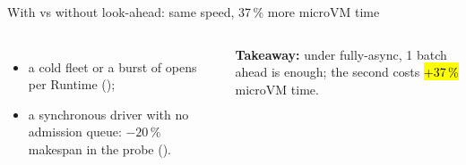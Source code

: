 \begin{frame}{With vs without look-ahead: same speed, 37\,\% more microVM time}
\begin{columns}[T]
\begin{itemize}
\item a cold fleet or a burst of opens per Runtime ();
\item a synchronous driver with no admission queue: $-20$\,\% makespan in the probe ().
\end{itemize}
\vspace{1mm}
\colorbox{panel}{\parbox{\dimexpr\linewidth-2\fboxsep}{\scriptsize\textbf{Takeaway:} under fully-async, 1 batch ahead is enough; the second costs \hl{+37\,\%} microVM time.}}
\end{columns}
\end{frame}

